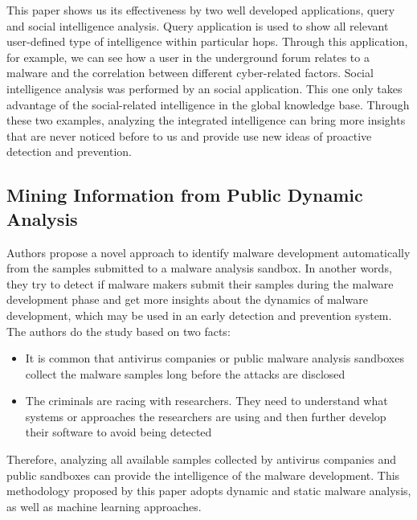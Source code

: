 \documentclass[11pt]{article}
\begin{document}
	This paper shows us its effectiveness by two well developed applications, query and social intelligence analysis. Query application is used to show all relevant user-defined type of intelligence within particular hops. Through this application, for example, we can see how a user in the underground forum relates to a malware and the correlation between different cyber-related factors. Social intelligence analysis was performed by an social application. This one only takes advantage of the social-related intelligence in the global knowledge base.
	Through these two examples, analyzing the integrated intelligence can bring more insights that are never noticed before to us and provide use new ideas of proactive detection and prevention.

	\subsection{Mining Information from Public Dynamic Analysis}
	Authors propose a novel approach to identify malware development automatically from the samples submitted to a malware analysis sandbox. In another words, they try to detect if malware makers submit their samples during the malware development phase and get more insights about the dynamics of malware development, which may be used in an early detection and prevention system. 	
	The authors do the study based on two facts:
	\begin{itemize}
		\item It is common that antivirus companies or public malware analysis sandboxes collect the malware samples long before the attacks are disclosed
		\item The criminals are racing with researchers. They need to understand what systems or approaches the researchers are using and then further develop their software to avoid being detected
	\end{itemize}
	Therefore, analyzing all available samples collected by antivirus companies and public sandboxes can provide the intelligence of the malware development. This methodology proposed by this paper adopts dynamic and static malware analysis, as well as machine learning approaches. 
\end{document}
